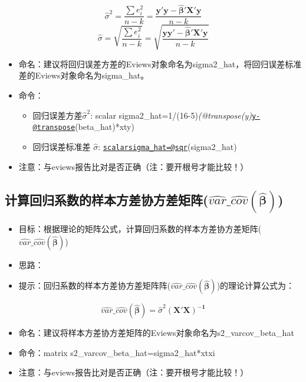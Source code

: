 \documentclass[12pt,(landscape,a4paper),(portrait,a4paper)]{article}
\providecommand{\tightlist}{%
  \setlength{\itemsep}{0pt}\setlength{\parskip}{0pt}}
\begin{document}
\[\hat{\sigma}^2=\frac{\sum{e_i^2}}{n-k}=\frac{\mathbf{y'y-\hat{\beta}'X'y}}{n-k}\]
\[\hat{\sigma}=\sqrt{\frac{\sum{e_i^2}}{n-k}}=\sqrt{\frac{\mathbf{yy'-\hat{\beta}'X'y}}{n-k}}\]

\begin{itemize}
\item
  命名：建议将回归误差方差的Eviews对象命名为sigma2\_hat，将回归误差标准差的Eviews对象命名为sigma\_hat。
\item
  命令：

  \begin{itemize}
  \tightlist
  \item
    回归误差方差\(\hat{\sigma}^2\): scalar
    sigma2\_hat=1/(16-5)\emph{(@transpose(y)}\href{mailto:y-@transpose}{\nolinkurl{y-@transpose}}(beta\_hat)*xty)
  \item
    回归误差标准差 \(\hat{\sigma}\):
    \href{mailto:scalarsigma_hat=@sqr}{\nolinkurl{scalarsigma\_hat=@sqr}}(sigma2\_hat)
  \end{itemize}
\item
  注意：与eviews报告比对是否正确（注：要开根号才能比较！）
\end{itemize}

\hypertarget{widehatvar_widehatcovmathbfhatbeta}{%
\subsection{\texorpdfstring{计算回归系数的样本方差协方差矩阵(\(\widehat{var}\_\widehat{cov}(\mathbf{\hat{\beta}})\))}{计算回归系数的样本方差协方差矩阵(\textbackslash{}widehat\{var\}\textbackslash{}\_\textbackslash{}widehat\{cov\}(\textbackslash{}mathbf\{\textbackslash{}hat\{\textbackslash{}beta\}\}))}}\label{widehatvar_widehatcovmathbfhatbeta}}

\begin{itemize}
\tightlist
\item
  目标：根据理论的矩阵公式，计算回归系数的样本方差协方差矩阵(\(\widehat{var}\_\widehat{cov}(\mathbf{\hat{\beta}})\))
\item
  思路：
\item
  提示：回归系数的样本方差协方差矩阵阵(\(\widehat{var}\_\widehat{cov}(\mathbf{\hat{\beta}})\))的理论计算公式为：
\end{itemize}

\[\widehat{var}\_\widehat{cov}(\mathbf{\hat{\beta}})=\hat{\sigma}^2\mathbf{(X'X)^{-1}}\]

\begin{itemize}
\tightlist
\item
  命名：建议将样本方差协方差矩阵的Eviews对象命名为s2\_varcov\_beta\_hat
\item
  命令：matrix s2\_varcov\_beta\_hat=sigma2\_hat*xtxi
\item
  注意：与eviews报告比对是否正确（注：要开根号才能比较！）
\end{itemize}
\end{document}
